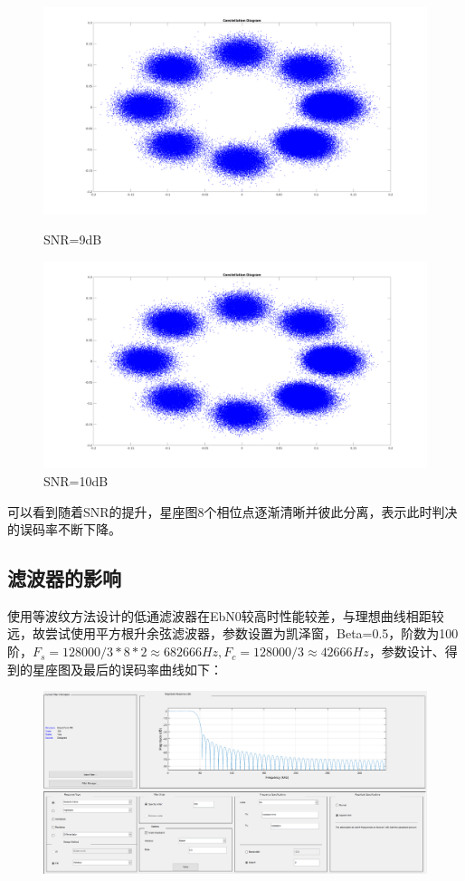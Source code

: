 \begin{spacing}{1.5}
\begin{figure}[H]
\begin{minipage}[t]{0.5\linewidth}
\centering
\includegraphics[width=0.9\columnwidth]{constellation15.png}
\caption{SNR=9dB}
\end{minipage}
\hfill
\begin{minipage}[t]{0.5\linewidth}
\centering
\includegraphics[width=0.9\columnwidth]{constellation16.png}
\caption{SNR=10dB}
\end{minipage}
\end{figure}

可以看到随着SNR的提升，星座图8个相位点逐渐清晰并彼此分离，表示此时判决的误码率不断下降。

\subsection{滤波器的影响}

使用等波纹方法设计的低通滤波器在EbN0较高时性能较差，与理想曲线相距较远，故尝试使用平方根升余弦滤波器，参数设置为凯泽窗，Beta=0.5，阶数为100阶，$F_s= 128000/3*8*2 \approx 682666 Hz, F_c = 128000/3 \approx 42666Hz$，参数设计、得到的星座图及最后的误码率曲线如下：

\begin{figure}[H]
\centering
\includegraphics[width = \columnwidth]{srcparam.png}
\end{figure}


\end{spacing}
